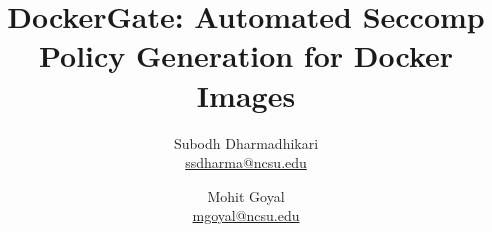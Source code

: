 \documentclass[10pt,twocolumn,pdftex]{article}
\title{DockerGate: Automated Seccomp Policy Generation for Docker Images}
\author{Subodh Dharmadhikari \\ \url{ssdharma@ncsu.edu} \and 
        Mohit Goyal \\ \url{mgoyal@ncsu.edu}\\
}
\date{}
\begin{document}
\maketitle














\clearpage
\pagebreak

\end{document}
